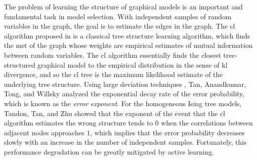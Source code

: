 \documentclass[11pt,onecolumn]{article}
\begin{document}
The problem of learning the structure  of graphical models is an important and fundamental task in model selection. With independent samples of random variables in the graph, the goal is to estimate the edges in the graph. The \ac{cl} algorithm proposed in \cite{chow1968approximating} is a classical tree structure learning algorithm, which finds the \ac{mst} of the graph whose weights are empirical estimates of mutual information between random variables. The \ac{cl} algorithm essentially finds the closest tree-structured graphical model to the empirical distribution in the sense of \ac{kl} divergence, and so the \ac{cl} tree is the maximum likelihood estimate of the underlying tree structure. Using   large deviation techniques \cite{zeitouni1998large}, Tan, Anandkumar, Tong, and Willsky\cite{tan2011large} analyzed the exponential decay rate  of the error probability, which is known as the {\em error exponent}. For the homogeneous Ising tree models, Tandon, Tan, and Zhu\cite{tandon2020exact} showed that the exponent of the event that the \ac{cl} algorithm estimates the wrong structure tends to $0$ when the correlations between adjacent nodes approaches $1$, which implies that the error probability decreases slowly with an increase in the  number of independent samples. Fortunately, this performance degradation can be greatly mitigated by active learning.
\end{document}
